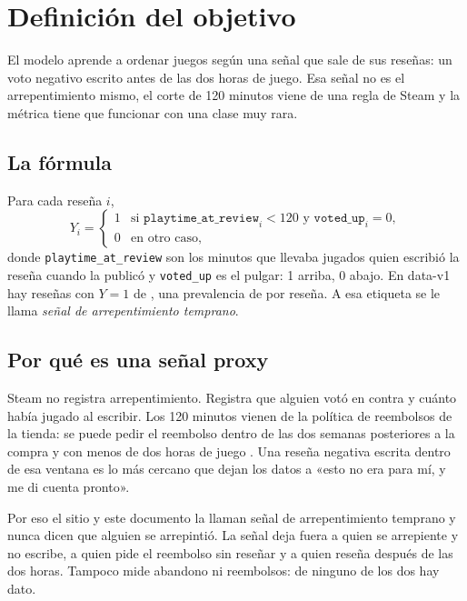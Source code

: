 \section{Definición del objetivo}\label{sec:objetivo}

El modelo aprende a ordenar juegos según una señal que sale de sus reseñas: un voto negativo
escrito antes de las dos horas de juego. Esa señal no es el arrepentimiento mismo, el corte de
120 minutos viene de una regla de Steam y la métrica tiene que funcionar con una clase muy rara.

\subsection{La fórmula}\label{sec:objetivo-formula}

Para cada reseña $i$,
\[
  Y_i =
  \begin{cases}
    1 & \text{si } \texttt{playtime\_at\_review}_i < 120 \text{ y } \texttt{voted\_up}_i = 0,\\
    0 & \text{en otro caso,}
  \end{cases}
\]
donde \texttt{playtime\_at\_review} son los minutos que llevaba jugados quien escribió la reseña
cuando la publicó y \texttt{voted\_up} es el pulgar: 1 arriba, 0 abajo. En data-v1 hay
\cifraPositivosEntrenamiento{} reseñas con $Y = 1$ de \cifraResenasEntrenamiento{}, una
prevalencia de \cifraPrevalenciaEntrenamientoPorResena{} por reseña. A esa etiqueta se le llama
\emph{señal de arrepentimiento temprano}.

\subsection{Por qué es una señal proxy}\label{sec:objetivo-proxy}

Steam no registra arrepentimiento. Registra que alguien votó en contra y cuánto había jugado al
escribir. Los 120 minutos vienen de la política de reembolsos de la tienda: se puede pedir el
reembolso dentro de las dos semanas posteriores a la compra y con menos de dos horas de juego
\parencite{steam_reembolsos}. Una reseña negativa escrita dentro de esa ventana es lo más cercano
que dejan los datos a «esto no era para mí, y me di cuenta pronto».

Por eso el sitio y este documento la llaman señal de arrepentimiento temprano y nunca dicen que
alguien se arrepintió. La señal deja fuera a quien se arrepiente y no escribe, a quien pide el
reembolso sin reseñar y a quien reseña después de las dos horas. Tampoco mide abandono ni
reembolsos: de ninguno de los dos hay dato.

